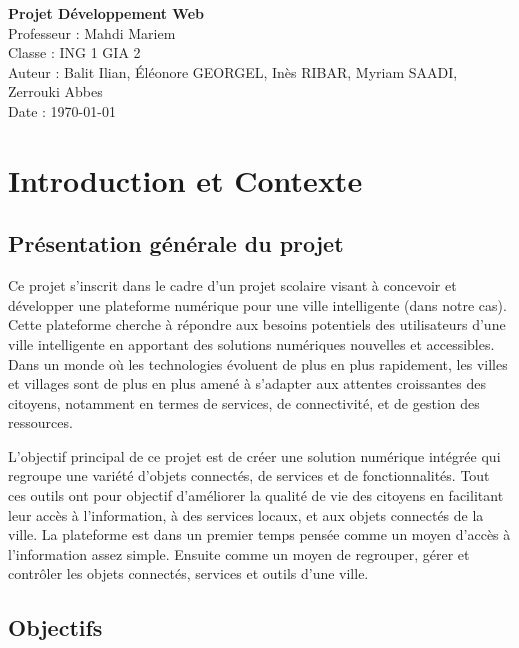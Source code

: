 \documentclass[a4paper,12pt]{report}
\begin{document}
	
	\begin{titlepage}
		
		\centering
		\vspace*{2cm}
		\Huge{\textbf{Projet Développement Web}} \\[1cm]
		\Large{Professeur : Mahdi Mariem} \\[2cm]
		\vfill
		\Large{
			Classe : ING 1 GIA 2 \\
			Auteur : Balit Ilian, Éléonore GEORGEL, Inès RIBAR, Myriam SAADI, Zerrouki Abbes \\
			Date : \today \\
		}
	\end{titlepage}
	
	\tableofcontents
	\newpage
	
	\section{Introduction et Contexte}
	
	\subsection{Présentation générale du projet}
	
	Ce projet s'inscrit dans le cadre d'un projet scolaire visant à concevoir et développer une plateforme numérique pour une ville intelligente (dans notre cas). Cette plateforme cherche à répondre aux besoins potentiels des utilisateurs d'une ville intelligente en apportant des solutions numériques nouvelles et accessibles. Dans un monde où les technologies évoluent de plus en plus rapidement, les villes et villages sont de plus en plus amené à s'adapter aux attentes croissantes des citoyens, notamment en termes de services, de connectivité, et de gestion des ressources.
	
	L’objectif principal de ce projet est de créer une solution numérique intégrée qui regroupe une variété d'objets connectés, de services et de fonctionnalités. Tout ces outils ont pour objectif d'améliorer la qualité de vie des citoyens en facilitant leur accès à l’information, à des services locaux, et aux objets connectés de la ville. La plateforme est dans un premier temps pensée comme un moyen d'accès à l'information assez simple. Ensuite comme un moyen de regrouper, gérer et contrôler les objets connectés, services et outils d'une ville.
	\subsection{Objectifs}
	
\end{document}
